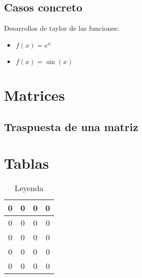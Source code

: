 \documentclass{article}
\begin{document}

\subsection{Casos concreto}

Desarrollos de taylor de las funciones:

\begin{itemize}
\item $f(x)=e^x$


\item $f(x) = \sin (x)$


\end{itemize}

\section{Matrices}


\subsection{Traspuesta de una matriz}


\section{Tablas}

\begin{table}[hbtp]
\centering
\begin{tabular}{c | c | c | c}
0 & 0 & 0 & 0 \\ \hline
0 & 0 & 0 & 0 \\ \hline
0 & 0 & 0 & 0 \\ \hline
0 & 0 & 0 & 0 \\ \hline
0 & 0 & 0 & 0
\end{tabular}
\caption{Leyenda}
\label{tbl:Tabla}
\end{table}
\end{document}
